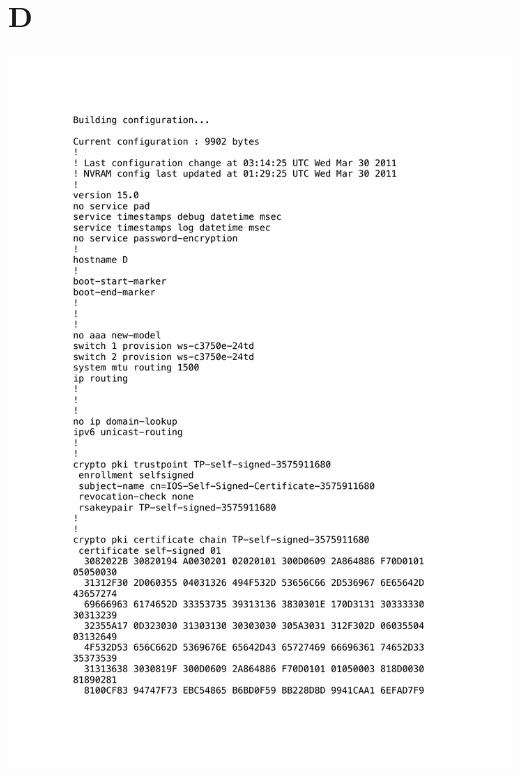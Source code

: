 \documentclass[11pt,a4paper]{scrreprt}
\begin{document}
\section{D}
\vspace{-1cm}
\includegraphics[height=\dimexpr\textheight-4\baselineskip\relax,page=1]{../config_files/D.pdf}

\end{document}

